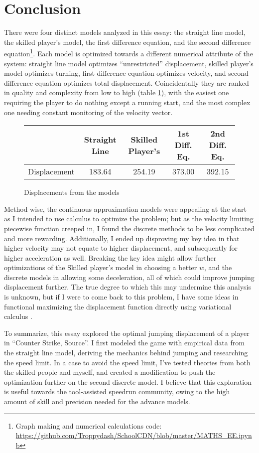 

\section{Conclusion}
There were four distinct models analyzed in this essay: the straight line model, the skilled player's model, the first difference equation, and the second difference equation\footnote{Graph making and numerical calculations code: \url{https://github.com/Troppydash/SchoolCDN/blob/master/MATHS_EE.ipynb}}. Each model is optimized towards a different numerical attribute of the system: straight line model optimizes ``unrestricted'' displacement, skilled player's model optimizes turning, first difference equation optimizes velocity, and second difference equation optimizes total displacement. Coincidentally they are ranked in quality and complexity from low to high (table \ref{tbl:dis}), with the easiest one requiring the player to do nothing except a running start, and the most complex one needing constant monitoring of the velocity vector.

\begin{figure}[H]
    \centering
    \begin{tabular}{|c|c|c|c|c|}
        \hline
        & Straight Line & Skilled Player's & 1st Diff. Eq. & 2nd Diff. Eq.\\
        \hline
        Displacement & 183.64  & 254.19 & 373.00 & 392.15 \\
        \hline
    \end{tabular}
    \caption{Displacements from the models}
    \label{tbl:dis}
\end{figure}

Method wise, the continuous approximation models were appealing at the start as I intended to use calculus to optimize the problem; but as the velocity limiting piecewise function creeped in, I found the discrete methods to be less complicated and more rewarding. Additionally, I ended up disproving my key idea in that higher velocity may not equate to higher displacement, and subsequently for higher acceleration as well. Breaking the key idea might allow further optimizations of the Skilled player's model in choosing a better $w$, and the discrete models in allowing some deceleration, all of which could improve jumping displacement further. The true degree to which this may undermine this analysis is unknown, but if I were to come back to this problem, I have some ideas in functional maximizing the displacement function directly using variational calculus .

To summarize, this essay explored the optimal jumping displacement of a player in ``Counter Strike, Source''. I first modeled the game with empirical data from the straight line model, deriving the mechanics behind jumping and researching the speed limit. In a case to avoid the speed limit, I've tested theories from both the skilled people and myself, and created a modification to push the optimization further on the second discrete model. I believe that this exploration is useful towards the tool-assisted speedrun community, owing to the high amount of skill and precision needed for the advance models.

